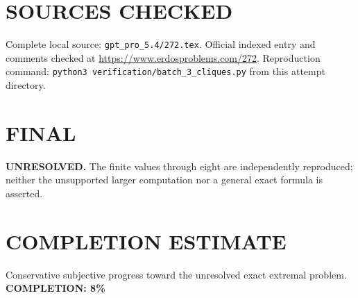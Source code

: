 \section{SOURCES CHECKED}
Complete local source: \texttt{gpt\_pro\_5.4/272.tex}. Official indexed entry and comments checked at \url{https://www.erdosproblems.com/272}. Reproduction command: \texttt{python3 verification/batch\_3\_cliques.py} from this attempt directory.
\section{FINAL}
\textbf{UNRESOLVED.} The finite values through eight are independently reproduced; neither the unsupported larger computation nor a general exact formula is asserted.
\section{COMPLETION ESTIMATE}
Conservative subjective progress toward the unresolved exact extremal problem.
\textbf{COMPLETION: 8\%}
